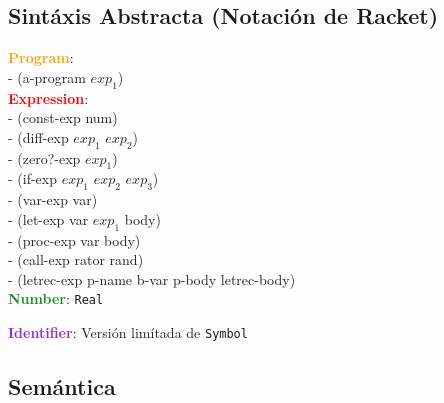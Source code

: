 \documentclass[11pt]{article}
\newcommand\Program{\textcolor{Orange}{\textbf{Program}}}
\newcommand\Expression{\textcolor{Red}{\textbf{Expression}}}
\newcommand\Number{\textcolor{ForestGreen}{\textbf{Number}}}
\newcommand\Identifier{\textcolor{BlueViolet}{\textbf{Identifier}}}
\begin{document}
\subsection*{Sintáxis Abstracta (Notación de Racket)}
\Program: \\
- (a-program $exp_1$) \\

\noindent \Expression: \\
- (const-exp num) \\
- (diff-exp $exp_1$ $exp_2$) \\
- (zero?-exp $exp_1$) \\
- (if-exp $exp_1$ $exp_2$ $exp_3$) \\
- (var-exp var) \\
- (let-exp var $exp_1$ body) \\
- (proc-exp var body) \\ 
- (call-exp rator rand) \\
- (letrec-exp p-name b-var p-body letrec-body) \\

\noindent \Number: \verb|Real|

\noindent \Identifier: Versión limítada de \verb|Symbol|

\subsection*{Semántica}
\end{document}
